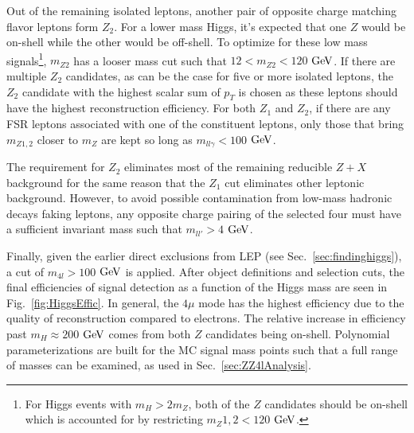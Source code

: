 Out of the remaining isolated leptons, another pair of opposite charge matching flavor leptons form $Z_2$. For a lower mass Higgs, it's expected that one $Z$ would be on-shell while the other would be off-shell. To optimize for these low mass signals\footnote{For Higgs events with $m_H > 2m_Z$, both of the $Z$ candidates should be on-shell which is accounted for by restricting $m_Z1,2 < 120$ $\rm{GeV}$.}, $m_{Z2}$ has a looser mass cut such that $12 < m_{Z2} < 120$ $\rm{GeV}$. If there are multiple $Z_2$ candidates, as can be the case for five or more isolated leptons, the $Z_2$ candidate with the highest scalar sum of $p_T$ is chosen as these leptons should have the highest reconstruction efficiency. For both $Z_1$ and $Z_2$, if there are any FSR leptons associated with one of the constituent leptons, only those that bring $m_{Z1,2}$ closer to $m_Z$ are kept so long as $m_{ll\gamma}<100$ $\rm{GeV}$.

The requirement for $Z_2$ eliminates most of the remaining reducible $Z+X$ background for the same reason that the $Z_1$ cut eliminates other leptonic background. However, to avoid possible contamination from low-mass hadronic decays faking leptons, any opposite charge pairing of the selected four must have a sufficient invariant mass such that $m_{ll'} > 4$ $\rm{GeV}$. 

Finally, given the earlier direct exclusions from LEP (see Sec.~\ref{sec:findinghiggs}), a cut of $m_{4l} >100$ $\rm{GeV}$ is applied. After object definitions and selection cuts, the final efficiencies of signal detection as a function of the Higgs mass are seen in Fig.~\ref{fig:HiggsEffic}. In general, the $4\mu$ mode has the highest efficiency due to the quality of reconstruction compared to electrons. The relative increase in efficiency past $m_H \approx 200$ $\rm{GeV}$ comes from both $Z$ candidates being on-shell. Polynomial parameterizations are built for the MC signal mass points such that a full range of masses can be examined, as used in Sec.~\ref{sec:ZZ4lAnalysis}.


